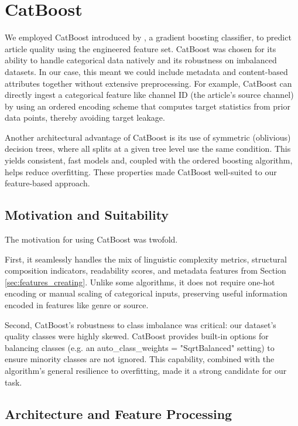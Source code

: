 
\newpage
\section{CatBoost}\label{sec:catboost}
We employed \ac{CatBoost} introduced by \cite{prokhorenkova2018catboost}, a gradient boosting classifier, to predict article quality using the engineered feature set. \ac{CatBoost} was chosen for its ability to handle categorical data natively and its robustness on imbalanced datasets.
In our case, this meant we could include metadata and content-based attributes together without extensive preprocessing. For example, \ac{CatBoost} can directly ingest a categorical feature like channel ID (the article's source channel) by using an ordered encoding scheme that computes target statistics from prior data points, thereby avoiding target leakage.

Another architectural advantage of \ac{CatBoost} is its use of symmetric (oblivious) decision trees, where all splits at a given tree level use the same condition.
This yields consistent, fast models and, coupled with the ordered boosting algorithm, helps reduce overfitting. These properties made \ac{CatBoost} well-suited to our feature-based approach.

\subsection{Motivation and Suitability} 
The motivation for using \ac{CatBoost} was twofold. 

First, it seamlessly handles the mix of linguistic complexity metrics, structural composition indicators, readability scores, and metadata features from Section \ref{sec:features_creating}. Unlike some algorithms, it does not require one-hot encoding or manual scaling of categorical inputs, preserving useful information encoded in features like genre or source. 

Second, \ac{CatBoost}'s robustness to class imbalance was critical: our dataset's quality classes were highly skewed. \ac{CatBoost} provides built-in options for balancing classes (e.g. an auto\_class\_weights = "SqrtBalanced" setting) to ensure minority classes are not ignored. This capability, combined with the algorithm's general resilience to overfitting, made it a strong candidate for our task.

\subsection{Architecture and Feature Processing} 

